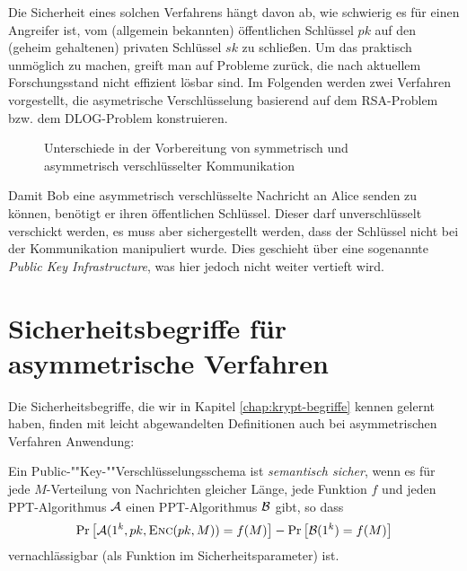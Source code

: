 Die Sicherheit eines solchen Verfahrens hängt davon ab, wie schwierig es
für einen Angreifer ist, vom (allgemein bekannten) öffentlichen
Schlüssel $pk$ auf den (geheim gehaltenen) privaten Schlüssel $sk$ zu
schließen. Um das praktisch unmöglich zu machen, greift man auf Probleme
zurück, die nach aktuellem Forschungsstand nicht effizient lösbar
sind. Im Folgenden werden zwei Verfahren vorgestellt, die asymetrische
Verschlüsselung basierend auf dem RSA-Problem bzw. dem DLOG-Problem
konstruieren. 

\begin{figure}
\caption{Unterschiede in der Vorbereitung von symmetrisch und
  asymmetrisch verschlüsselter Kommunikation}
\label{fig:asymmenc-symmenc}
\end{figure}
Damit Bob eine asymmetrisch verschlüsselte Nachricht an Alice senden zu
können, benötigt er ihren öffentlichen Schlüssel. Dieser darf
unverschlüsselt verschickt werden, es muss aber sichergestellt werden,
dass der Schlüssel nicht bei der Kommunikation manipuliert wurde. Dies
geschieht über eine sogenannte \textit{Public Key Infrastructure}, was
hier jedoch nicht weiter vertieft wird.
\section{Sicherheitsbegriffe für asymmetrische Verfahren}
Die Sicherheitsbegriffe, die wir in Kapitel \ref{chap:krypt-begriffe}
kennen gelernt haben, finden mit leicht abgewandelten Definitionen auch
bei asymmetrischen Verfahren Anwendung:

\begin{definition}
Ein Pub\-lic-""Key-""Ver\-schlüs\-sel\-ungs\-sche\-ma ist \textit{semantisch sicher}, wenn es für jede $M$-Verteilung von Nachrichten gleicher Länge, jede
Funktion $f$ und jeden PPT-Algorithmus $\mathcal{A}$ einen PPT-Algorithmus $\mathcal{B}$ gibt, so dass
\begin{equation*}
\Pr\left[\mathcal{A}(1^k, pk, \textsc{Enc}(pk, M)) = f(M)\right] - \Pr\left[\mathcal{B}(1^k) = f(M)\right]
\end{equation*}
vernachlässigbar (als Funktion im Sicherheitsparameter) ist.
\end{definition}

